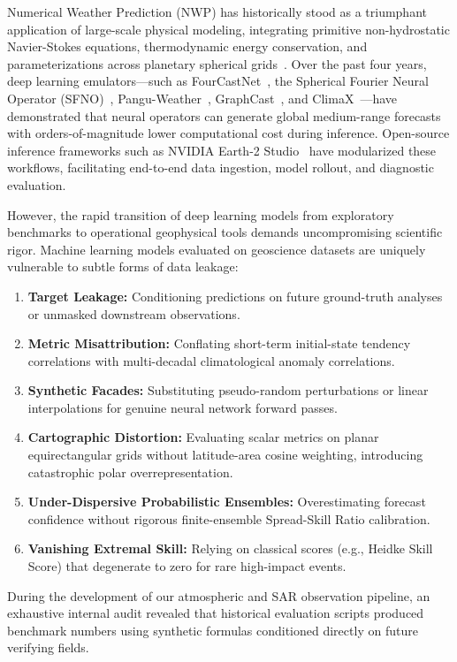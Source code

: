 \documentclass[10pt,twocolumn,letterpaper]{article}
\begin{document}
Numerical Weather Prediction (NWP) has historically stood as a triumphant application of large-scale physical modeling, integrating primitive non-hydrostatic Navier-Stokes equations, thermodynamic energy conservation, and parameterizations across planetary spherical grids~\cite{bauer2015quiet}. Over the past four years, deep learning emulators---such as FourCastNet~\cite{pathak2022fourcastnet}, the Spherical Fourier Neural Operator (SFNO)~\cite{bonev2023spherical}, Pangu-Weather~\cite{bi2023accurate}, GraphCast~\cite{lam2023learning}, and ClimaX~\cite{nguyen2023climax}---have demonstrated that neural operators can generate global medium-range forecasts with orders-of-magnitude lower computational cost during inference. Open-source inference frameworks such as NVIDIA Earth-2 Studio~\cite{earth2studio2024} have modularized these workflows, facilitating end-to-end data ingestion, model rollout, and diagnostic evaluation.

However, the rapid transition of deep learning models from exploratory benchmarks to operational geophysical tools demands uncompromising scientific rigor. Machine learning models evaluated on geoscience datasets are uniquely vulnerable to subtle forms of data leakage:
\begin{enumerate}
    \item \textbf{Target Leakage:} Conditioning predictions on future ground-truth analyses or unmasked downstream observations.
    \item \textbf{Metric Misattribution:} Conflating short-term initial-state tendency correlations with multi-decadal climatological anomaly correlations.
    \item \textbf{Synthetic Facades:} Substituting pseudo-random perturbations or linear interpolations for genuine neural network forward passes.
    \item \textbf{Cartographic Distortion:} Evaluating scalar metrics on planar equirectangular grids without latitude-area cosine weighting, introducing catastrophic polar overrepresentation.
    \item \textbf{Under-Dispersive Probabilistic Ensembles:} Overestimating forecast confidence without rigorous finite-ensemble Spread-Skill Ratio calibration.
    \item \textbf{Vanishing Extremal Skill:} Relying on classical scores (e.g., Heidke Skill Score) that degenerate to zero for rare high-impact events.
\end{enumerate}

During the development of our atmospheric and SAR observation pipeline, an exhaustive internal audit revealed that historical evaluation scripts produced benchmark numbers using synthetic formulas conditioned directly on future verifying fields.
\end{document}
